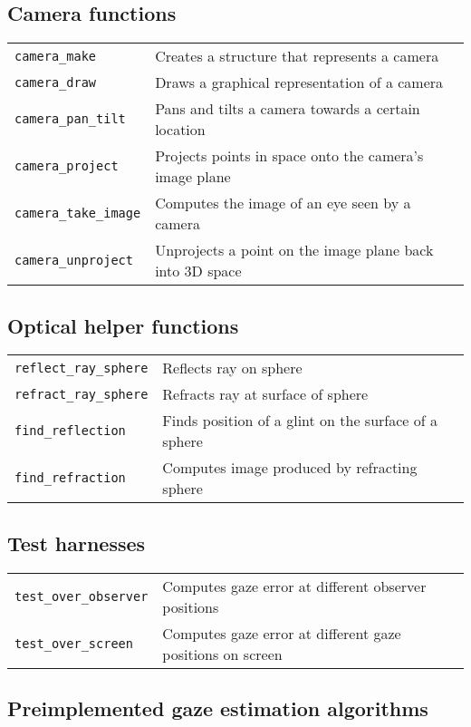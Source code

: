 \documentclass{scrartcl}
\begin{document}
\subsection*{Camera functions}

\begin{longtable}{p{4cm}p{9.2cm}}
\texttt{camera\_make} & Creates a structure that represents a camera \\
\texttt{camera\_draw} & Draws a graphical representation of a camera \\
\texttt{camera\_pan\_tilt} & Pans and tilts a camera towards a certain
    location \\
\texttt{camera\_project} & Projects points in space onto the camera's image
    plane \\
\texttt{camera\_take\_image} & Computes the image of an eye seen by a 
    camera \\
\texttt{camera\_unproject} & Unprojects a point on the image plane back into
    3D space
\end{longtable}

\subsection*{Optical helper functions}

\begin{longtable}{p{4cm}p{9.2cm}}
\texttt{reflect\_ray\_sphere} & Reflects ray on sphere \\
\texttt{refract\_ray\_sphere} & Refracts ray at surface of sphere \\
\texttt{find\_reflection} & Finds position of a glint on the surface of a
    sphere \\
\texttt{find\_refraction} & Computes image produced by refracting sphere
\end{longtable}

\subsection*{Test harnesses}

\begin{longtable}{p{4cm}p{9.2cm}}
\texttt{test\_over\_observer} & Computes gaze error at different observer
    positions \\
\texttt{test\_over\_screen} & Computes gaze error at different gaze positions
    on screen
\end{longtable}

\subsection*{Preimplemented gaze estimation algorithms}
\end{document}
